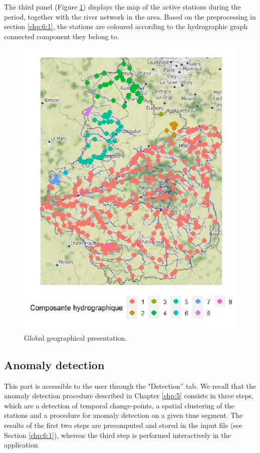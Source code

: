 The third panel (Figure \ref{fig:Imapp2}) displays the map of the active stations during the period, together with the river network in the area. Based on the preprocessing in section \ref{chp:6:1}, the stations are coloured according to the hydrographic graph connected component they belong to. 

\begin{figure}[htbp]
  \centering
  \includegraphics{figs/Chap6/Im_app2.pdf}
  \caption{Global geographical presentation.}
  \label{fig:Imapp2}
\end{figure}

\subsection{Anomaly detection}\label{chp:6:2:2}

This part is accessible to the user through the "Detection” tab. We recall that the anomaly detection procedure described in Chapter \ref{chp:5} consists in three steps, which are a detection of temporal change-points, a spatial clustering of the stations and a procedure for anomaly detection on a given time segment. The results of the first two steps are precomputed and stored in the input file (see Section \ref{chp:6:1}), whereas the third step is performed interactively in the application

